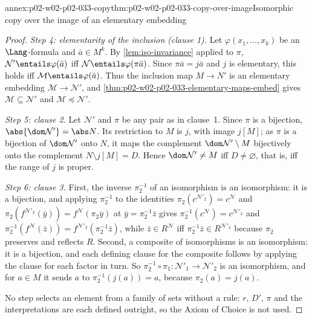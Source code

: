 \begin{annexitem}{annex:p02-w02-p02-033-copy}{thm:p02-w02-p02-033-copy-over-image}{Isomorphic copy over the image of an elementary embedding}
\begin{proof}
\emph{Step 4: elementarity of the inclusion (clause 1).}  Let
\(\varphi(x_1,\ldots,x_k)\) be an \(\Lang\)-formula and
\(\bar a\in M^k\).  By \cref{lem:iso-invariance} applied to \(\pi\),
\(\mathcal N'\entails\varphi(\bar a)\) iff
\(\mathcal N\entails\varphi(\pi\bar a)\).  Since \(\pi\bar a=j\bar a\) and
\(j\) is elementary, this holds iff \(\mathcal M\entails\varphi(\bar a)\).
Thus the inclusion map \(M\to N'\) is an elementary embedding
\(\mathcal M\to\mathcal N'\), and
\cref{thm:p02-w02-p02-033-elementary-maps-embed} gives
\(\mathcal M\subseteq\mathcal N'\) and \(\mathcal M\preccurlyeq\mathcal N'\).

\emph{Step 5: clause 2.}  Let \(\mathcal N'\) and \(\pi\) be any pair as in
clause~1.  Since \(\pi\) is a bijection, \(\abs{\dom\mathcal N'}=\abs N\).
Its restriction to \(M\) is \(j\), with image \(j[M]\); as \(\pi\) is a
bijection of \(\dom\mathcal N'\) onto \(N\), it maps the complement
\(\dom\mathcal N'\setminus M\) bijectively onto the complement
\(N\setminus j[M]=D\).  Hence \(\dom\mathcal N'\ne M\) iff
\(D\ne\varnothing\), that is, iff the range of \(j\) is proper.

\emph{Step 6: clause 3.}  First, the inverse \(\pi_2^{-1}\) of an
isomorphism is an isomorphism: it is a bijection, and applying
\(\pi_2^{-1}\) to the identities
\(\pi_2(c^{\mathcal N'_2})=c^{\mathcal N}\) and
\(\pi_2(f^{\mathcal N'_2}(\bar y))=f^{\mathcal N}(\pi_2\bar y)\) at
\(\bar y=\pi_2^{-1}\bar z\) gives
\(\pi_2^{-1}(c^{\mathcal N})=c^{\mathcal N'_2}\) and
\(\pi_2^{-1}(f^{\mathcal N}(\bar z))=f^{\mathcal N'_2}(\pi_2^{-1}\bar z)\),
while \(\bar z\in R^{\mathcal N}\) iff
\(\pi_2^{-1}\bar z\in R^{\mathcal N'_2}\) because \(\pi_2\) preserves and
reflects \(R\).  Second, a composite of isomorphisms is an isomorphism: it
is a bijection, and each defining clause for the composite follows by
applying the clause for each factor in turn.  So
\(\pi_2^{-1}\circ\pi_1:\mathcal N'_1\to\mathcal N'_2\) is an isomorphism,
and for \(a\in M\) it sends \(a\) to \(\pi_2^{-1}(j(a))=a\), because
\(\pi_2(a)=j(a)\).

No step selects an element from a family of sets without a rule: \(r\),
\(D'\), \(\pi\) and the interpretations are each defined outright, so the
Axiom of Choice is not used.
\end{proof}
\end{annexitem}

